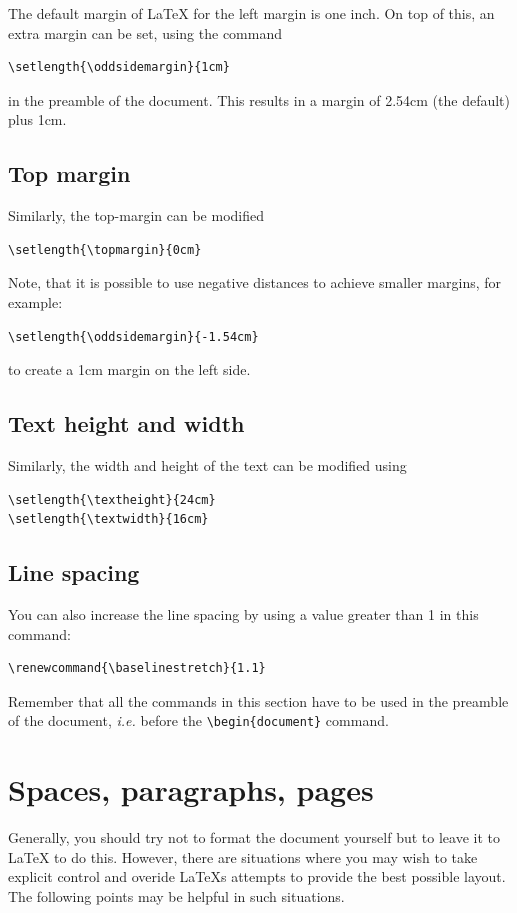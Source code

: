 \documentclass[12pt,a4paper]{article}
\begin{document}
The default margin of \LaTeX{} for the left margin is one inch. On top
of this, an extra margin can be set, using the command
\begin{verbatim}
\setlength{\oddsidemargin}{1cm}
\end{verbatim} 
in the preamble of the document. This results in a margin of 2.54cm
(the default) plus 1cm.

\subsection{Top margin}
Similarly, the top-margin can be modified 
\begin{verbatim}
\setlength{\topmargin}{0cm}
\end{verbatim}

Note, that it is possible to use negative distances to achieve smaller
margins, for example:
\begin{verbatim}
\setlength{\oddsidemargin}{-1.54cm}
\end{verbatim} to create a 1cm margin on the left side.


\subsection{Text height and width}

Similarly, the width and height of the text can be modified using
\begin{verbatim}
\setlength{\textheight}{24cm}
\setlength{\textwidth}{16cm}
\end{verbatim}

\subsection{Line spacing}
You can also increase the line spacing by using a value greater than 1
in this command:
\begin{verbatim}
\renewcommand{\baselinestretch}{1.1}
\end{verbatim}

Remember that all the commands in this section have to be used in the
preamble of the document, \emph{i.e.} before the
\verb:\begin{document}: command.


\section{Spaces, paragraphs, pages}
Generally, you should try not to format the document yourself but to
leave it to \LaTeX{} to do this. However, there are situations where
you may wish to take explicit control and overide \LaTeX s attempts to
provide the best possible layout. The following points may be helpful
in such situations. 
\end{document}
